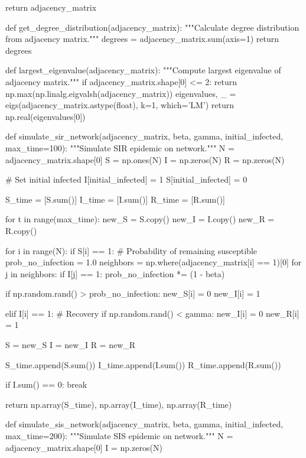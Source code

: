\documentclass[a4paper, 11pt]{article}
\begin{document}
\begin{pycode}
    return adjacency_matrix

def get_degree_distribution(adjacency_matrix):
    """Calculate degree distribution from adjacency matrix."""
    degrees = adjacency_matrix.sum(axis=1)
    return degrees

def largest_eigenvalue(adjacency_matrix):
    """Compute largest eigenvalue of adjacency matrix."""
    if adjacency_matrix.shape[0] <= 2:
        return np.max(np.linalg.eigvalsh(adjacency_matrix))
    eigenvalues, _ = eigs(adjacency_matrix.astype(float), k=1, which='LM')
    return np.real(eigenvalues[0])

def simulate_sir_network(adjacency_matrix, beta, gamma, initial_infected, max_time=100):
    """Simulate SIR epidemic on network."""
    N = adjacency_matrix.shape[0]
    S = np.ones(N)
    I = np.zeros(N)
    R = np.zeros(N)

    # Set initial infected
    I[initial_infected] = 1
    S[initial_infected] = 0

    S_time = [S.sum()]
    I_time = [I.sum()]
    R_time = [R.sum()]

    for t in range(max_time):
        new_S = S.copy()
        new_I = I.copy()
        new_R = R.copy()

        for i in range(N):
            if S[i] == 1:
                # Probability of remaining susceptible
                prob_no_infection = 1.0
                neighbors = np.where(adjacency_matrix[i] == 1)[0]
                for j in neighbors:
                    if I[j] == 1:
                        prob_no_infection *= (1 - beta)

                if np.random.rand() > prob_no_infection:
                    new_S[i] = 0
                    new_I[i] = 1

            elif I[i] == 1:
                # Recovery
                if np.random.rand() < gamma:
                    new_I[i] = 0
                    new_R[i] = 1

        S = new_S
        I = new_I
        R = new_R

        S_time.append(S.sum())
        I_time.append(I.sum())
        R_time.append(R.sum())

        if I.sum() == 0:
            break

    return np.array(S_time), np.array(I_time), np.array(R_time)

def simulate_sis_network(adjacency_matrix, beta, gamma, initial_infected, max_time=200):
    """Simulate SIS epidemic on network."""
    N = adjacency_matrix.shape[0]
    I = np.zeros(N)


\end{pycode}
\end{document}
